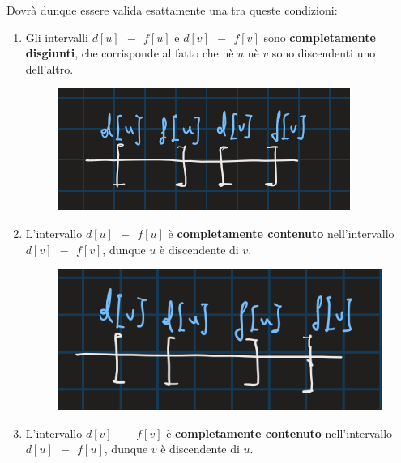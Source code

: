 \documentclass{article}
\begin{document}
Dovrà dunque essere valida esattamente una tra queste condizioni:

\vskip 1cm

\begin{enumerate}
    \item Gli intervalli $d[u] \: \: - \: \: f[u] $ e $d[v] \: \: - \: \: f[v] $ sono \textbf{completamente disgiunti}, che corrisponde al fatto che nè $u$ nè $v$ sono discendenti uno dell'altro.

    \begin{figure}[htbp]
        \center
        \includegraphics[scale=0.55]{img/parenthesis1.png}
    \end{figure}

    \vskip 2cm
    
    \item L'intervallo $d[u] \: \: - \: \: f[u]$ è \textbf{completamente contenuto} nell'intervallo $d[v] \: \: - \: \: f[v]$, dunque $u$ è discendente di $v$.

    \begin{figure}[htbp]
        \center
        \includegraphics[scale=0.35]{img/parenthesis3.png}
    \end{figure}

    \vskip 2cm
    
    \item L'intervallo $d[v] \: \: - \: \: f[v]$ è \textbf{completamente contenuto} nell'intervallo $d[u] \: \: - \: \: f[u]$, dunque $v$ è discendente di $u$.


\end{enumerate}
\end{document}
